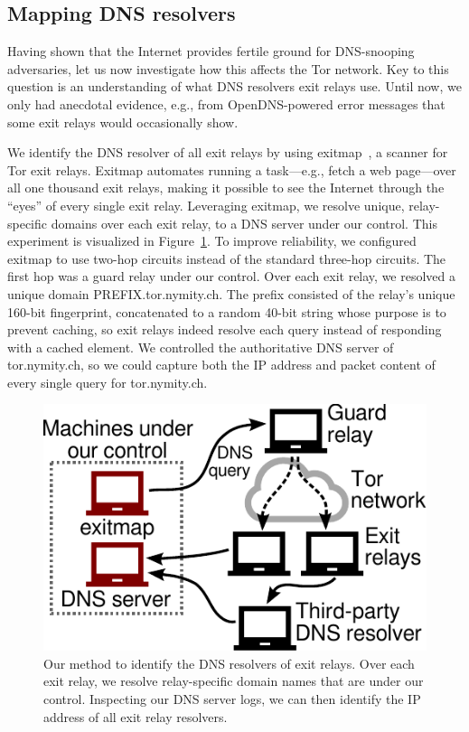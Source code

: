 \subsection{Mapping DNS resolvers}
\label{sec:mapping-resolvers}
Having shown that the Internet provides fertile ground for DNS-snooping
adversaries, let us now investigate how this affects the Tor network.  Key to
this question is an understanding of what DNS resolvers exit relays use.  Until
now, we only had anecdotal evidence, e.g., from OpenDNS-powered error messages
that some exit relays would occasionally show.

We identify the DNS resolver of all exit relays by using
exitmap~\cite{exitmap}, a scanner for Tor exit relays.  Exitmap automates
running a task---e.g., fetch a web page---over all one thousand exit relays,
making it possible to see the Internet through the ``eyes'' of every single
exit relay.  Leveraging exitmap, we resolve unique, relay-specific domains over
each exit relay, to a DNS server under our control.  This experiment is
visualized in Figure~\ref{fig:dnsenum}.  To improve reliability, we configured
exitmap to use two-hop circuits instead of the standard three-hop circuits.
The first hop was a guard relay under our control.  Over each exit relay, we
resolved a unique domain PREFIX.tor.nymity.ch.  The prefix consisted of the
relay's unique 160-bit fingerprint, concatenated to a random 40-bit string
whose purpose is to prevent caching, so exit relays indeed resolve each query
instead of responding with a cached element.  We controlled the authoritative
DNS server of tor.nymity.ch, so we could capture both the IP address and packet
content of every single query for tor.nymity.ch.

\begin{figure}[t]
	\centering
	\includegraphics[width=0.65\linewidth]{figures/resolver-identification.pdf}
	\caption{Our method to identify the DNS resolvers of exit relays.  Over
	each exit relay, we resolve relay-specific domain names that are under our
	control.  Inspecting our DNS server logs, we can then identify the IP
	address of all exit relay resolvers.}
	\label{fig:dnsenum}
\end{figure}

